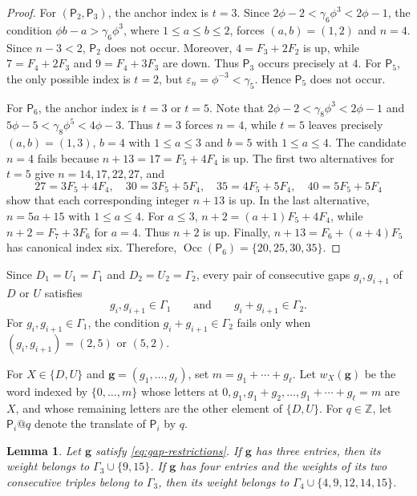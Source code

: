 \documentclass[11pt]{amsart}
\newtheorem{lemma}[theorem]{Lemma}
\theoremstyle{definition}
\newcommand{\eps}{\varepsilon}
\begin{document}
\begin{proof}
For $(\mathsf P_2,\mathsf P_3)$, the anchor index is $t=3$. Since $2\phi-2<\gamma_6\phi^3<2\phi-1$, the condition $\phi b-a>\gamma_6\phi^3$, where
$1\leq a\leq b\leq2$, forces $(a,b)=(1,2)$ and $n=4$.
Since $n-3<2$, $\mathsf P_2$ does not occur. Moreover,
$4=F_3+2F_2$ is up, while $7=F_4+2F_3$ and
$9=F_4+3F_3$ are down. Thus $\mathsf P_3$ occurs precisely at $4$.
For $\mathsf P_5$, the only possible index is $t=2$, but
$\eps_n=\phi^{-3}<\gamma_5$. Hence $\mathsf P_5$ does not occur.

For $\mathsf P_6$, the anchor index is $t=3$ or $t=5$. Note that $2\phi-2<\gamma_8\phi^3<2\phi-1$ and $5\phi-5<\gamma_8\phi^5<4\phi-3$. Thus $t=3$ forces $n=4$, while $t=5$ leaves precisely $(a,b)=(1,3)$, $b=4$ with $1\leq a\leq3$ and $b=5$ with $1\leq a\leq4$. The candidate $n=4$ fails because
$n+13=17=F_5+4F_4$ is up. The first two alternatives for $t=5$ give
$n=14,17,22,27$, and
\[
27=3F_5+4F_4,\quad30=3F_5+5F_4,\quad
35=4F_5+5F_4,\quad40=5F_5+5F_4
\]
show that each corresponding integer $n+13$ is up. In the last
alternative, $n=5a+15$ with $1\leq a\leq4$. For $a\leq3$, $n+2=(a+1)F_5+4F_4$,
while $n+2=F_7+3F_6$ for $a=4$. Thus $n+2$ is up. Finally, $n+13=F_6+(a+4)F_5$
has canonical index six. Therefore,
$\operatorname{Occ}(\mathsf P_6)=\{20,25,30,35\}$.
\end{proof}

Since $D_1=U_1=\Gamma_1$ and $D_2=U_2=\Gamma_2$, every pair of
consecutive gaps $g_i,g_{i+1}$ of $D$ or $U$ satisfies
\begin{equation}\label{eq:gap-restrictions}
g_i,g_{i+1}\in\Gamma_1
\qquad\text{and}\qquad
g_i+g_{i+1}\in\Gamma_2.
\end{equation}
For $g_i,g_{i+1}\in\Gamma_1$, the condition
$g_i+g_{i+1}\in\Gamma_2$ fails only when
$(g_i,g_{i+1})=(2,5)$ or $(5,2)$.

For $X\in\{D,U\}$ and $\mathbf g=(g_1,\ldots,g_\ell)$, set
$m=g_1+\cdots+g_\ell$. Let $w_X(\mathbf g)$ be the word indexed by
$\{0,\ldots,m\}$ whose letters at $0,g_1,g_1+g_2,\ldots,g_1+\cdots+g_\ell=m$
are $X$, and whose remaining letters are the other element of
$\{D,U\}$. For $q\in\mathbb Z$, let $\mathsf P_i@q$ denote the
translate of $\mathsf P_i$ by $q$.

\begin{lemma}\label{lem:arithmetic-reduction}
Let $\mathbf g$ satisfy \eqref{eq:gap-restrictions}. If $\mathbf g$ has
three entries, then its weight belongs to
$\Gamma_3\cup\{9,15\}$. If $\mathbf g$ has four entries and the weights
of its two consecutive triples belong to $\Gamma_3$, then its weight
belongs to $\Gamma_4\cup\{4,9,12,14,15\}$.
\end{lemma}
\end{document}
